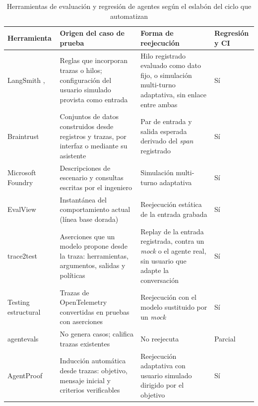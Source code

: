 \begin{table}[H]
  \caption{Herramientas de evaluación y regresión de agentes según el eslabón del ciclo que automatizan}
  \label{tab:herramientas}
  \begin{tabular}{|>{\raggedright\arraybackslash}p{1.1in}|>{\raggedright\arraybackslash}p{1.85in}|>{\raggedright\arraybackslash}p{1.85in}|>{\centering\arraybackslash}p{0.8in}|}
    \hline
    \textbf{Herramienta} & \textbf{Origen del caso de prueba} & \textbf{Forma de reejecución} & \textbf{Regresión y CI} \\ \hline
    LangSmith \cite{langsmith2026eval}, \cite{langsmith2026multiturn} & Reglas que incorporan trazas o hilos; configuración del usuario simulado provista como entrada & Hilo registrado evaluado como dato fijo, o simulación multi-turno adaptativa, sin enlace entre ambas & Sí \\ \hline
    Braintrust \cite{braintrust2026datasets} & Conjuntos de datos construidos desde registros y trazas, por interfaz o mediante su asistente & Par de entrada y salida esperada derivado del \textit{span} registrado & Sí \\ \hline
    Microsoft Foundry \cite{microsoft2026foundry} & Descripciones de escenario y consultas escritas por el ingeniero & Simulación multi-turno adaptativa & Sí \\ \hline
    EvalView \cite{evalview} & Instantánea del comportamiento actual (línea base dorada) & Reejecución estática de la entrada grabada & Sí \\ \hline
    trace2test \cite{trace2test} & Aserciones que un modelo propone desde la traza: herramientas, argumentos, salidas y políticas & Replay de la entrada registrada, contra un \textit{mock} o el agente real, sin usuario que adapte la conversación & Sí \\ \hline
    Testing estructural \cite{kohl2026structural} & Trazas de OpenTelemetry convertidas en pruebas con aserciones & Reejecución con el modelo sustituido por un \textit{mock} & Sí \\ \hline
    agentevals \cite{agentevals} & No genera casos; califica trazas existentes & No reejecuta & Parcial \\ \hline
    AgentProof & Inducción automática desde trazas: objetivo, mensaje inicial y criterios verificables & Reejecución adaptativa con usuario simulado dirigido por el objetivo & Sí \\ \hline
  \end{tabular}
\end{table}

